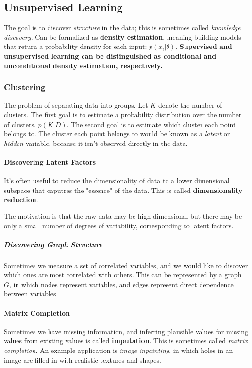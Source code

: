 \documentclass[11pt]{article}
\theoremstyle{definition}
\begin{document}
    \subsection{Unsupervised Learning}
        The goal is to discover \emph{structure} in the data; this is sometimes called \emph{knowledge discovery}.
        Can be formalized as \textbf{density estimation}, meaning building models that return a probability density for each input: $p(x_i|\theta)$.
        \textbf{Supervised and unsupervised learning can be distinguished as conditional and unconditional density estimation, respectively.}
        \subsubsection{Clustering}
            The problem of separating data into groups. Let $K$ denote the number of clusters. The first goal is to estimate a probability distribution over the number of clusters, $p(K|D)$. The second goal is to estimate which cluster each point belongs to. The cluster each point belongs to would be known as a \emph{latent} or \emph{hidden} variable, because it isn't observed directly in the data. 
            \paragraph{Discovering Latent Factors}
                It's often useful to reduce the dimensionality of data to a lower dimensional subspace that caputres the "essence" of the data. This is called \textbf{dimensionality reduction}.

                The motivation is that the raw data may be high dimensional but there may be only a small number of degrees of variability, corresponding to latent factors.
                \subparagraph{Discovering Graph Structure}
                    Sometimes we measure a set of correlated variables, and we would like to discover which ones are most correlated with others. This can be represented by a graph $G$, in which nodes represent variables, and edges represent direct dependence between variables
            \paragraph{Matrix Completion} 
                Sometimes we have missing information, and inferring plausible values for missing values from existing values is called \textbf{imputation}. This is sometimes called \emph{matrix completion}.
                An example application is \emph{image inpainting}, in which holes in an image are filled in with realistic textures and shapes.
                
\end{document}
